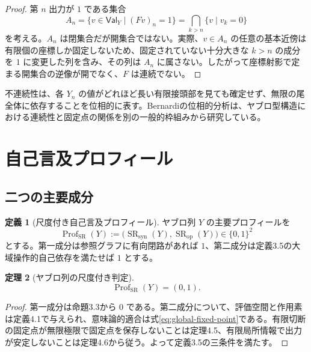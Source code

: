 \documentclass[a4paper,11pt]{ltjsarticle}
\theoremstyle{definition}
\newtheorem{definition}{定義}[section]
\theoremstyle{plain}
\newtheorem{theorem}[definition]{定理}
\newcommand{\Val}{\mathsf{Val}}
\newcommand{\SR}{\operatorname{SR}}
\newcommand{\Prof}{\operatorname{Prof}}
\begin{document}
\begin{proof}
第 $n$ 出力が $1$ である集合
\begin{equation}
 A_n=\{v\in\Val_Y\mid(Fv)_n=1\}
 =\bigcap_{k>n}\{v\mid v_k=0\}
\end{equation}
を考える。$A_n$ は閉集合だが開集合ではない。実際、$v\in A_n$ の任意の基本近傍は有限個の座標しか固定しないため、固定されていない十分大きな $k>n$ の成分を $1$ に変更した列を含み、その列は $A_n$ に属さない。したがって座標射影で定まる開集合の逆像が開でなく、$F$ は連続でない。
\end{proof}

不連続性は、各 $Y_n$ の値がどれほど長い有限接頭部を見ても確定せず、無限の尾全体に依存することを位相的に表す。Bernardiの位相的分析は、ヤブロ型構造における連続性と固定点の関係を別の一般的枠組みから研究している\cite{Bernardi2009Yablo}。

\section{自己言及プロフィール}

\subsection{二つの主要成分}

\begin{definition}[尺度付き自己言及プロフィール]
ヤブロ列 $Y$ の主要プロフィールを
\begin{equation}
 \Prof_{\SR}(Y)
 :=
 \bigl(
 \SR_{\mathrm{syn}}(Y),
 \SR_{\mathrm{op}}(Y)
 \bigr)
 \in\{0,1\}^2
 \label{eq:sr-profile}
\end{equation}
とする。第一成分は参照グラフに有向閉路があれば $1$、第二成分は定義3.5の大域操作的自己依存を満たせば $1$ とする。
\end{definition}

\begin{theorem}[ヤブロ列の尺度付き判定]
\begin{equation}
 \Prof_{\SR}(Y)=(0,1).
 \label{eq:yablo-profile}
\end{equation}
\end{theorem}

\begin{proof}
第一成分は命題3.3から $0$ である。第二成分について、評価空間と作用素は定義4.1で与えられ、意味論的適合は式\eqref{eq:global-fixed-point}である。有限切断の固定点が無限極限で固定点を保存しないことは定理4.5、有限局所情報で出力が安定しないことは定理4.6から従う。よって定義3.5の三条件を満たす。
\end{proof}
\end{document}
